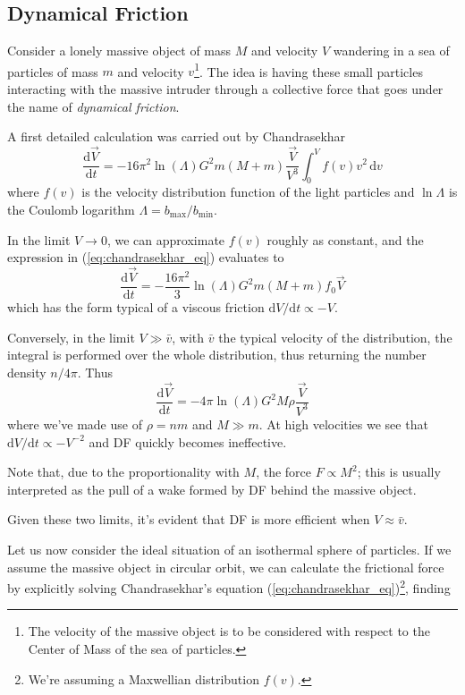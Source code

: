 \subsection{Dynamical Friction}
Consider a lonely massive object of mass $M$ and velocity $V$ wandering in a sea of particles of mass $m$ and velocity $v$\footnote{The velocity of the massive object is to be considered with respect to the Center of Mass of the sea of particles.}. The idea is having these small particles interacting with the massive intruder through a collective force that goes under the name of \emph{dynamical friction}.
\par A first detailed calculation was carried out by Chandrasekhar
\begin{equation}
    \frac{\text{d}\vec{V}}{\text{d}t} = -16\pi^{2}\ln(\Lambda)G^{2}m(M+m)\frac{\vec{V}}{V^{3}}\int_{0}^{V}f(v)v^{2}\,\text{d}v
    \label{eq:chandrasekhar_eq}
\end{equation}
where $f(v)$ is the velocity distribution function of the light particles and $\ln\Lambda$ is the Coulomb logarithm $\Lambda = b_{\text{max}}/b_{\text{min}}$.
\par In the limit $V \to 0$, we can approximate $f(v)$ roughly as constant, and the expression in (\ref{eq:chandrasekhar_eq}) evaluates to
\begin{equation*}
     \frac{\text{d}\vec{V}}{\text{d}t} = -\frac{16\pi^{2}}{3}\ln(\Lambda)G^{2}m(M+m)f_{0}\vec{V}
\end{equation*}
which has the form typical of a viscous friction $\text{d}V/\text{d}t \propto -V$.
\par Conversely, in the limit $V \gg \bar{v}$, with $\bar{v}$ the typical velocity of the distribution, the integral is performed over the whole distribution, thus returning the number density $n/4\pi$. Thus
\begin{equation*}
    \frac{\text{d}\vec{V}}{\text{d}t} = -4\pi\ln(\Lambda)G^{2}M\rho\frac{\vec{V}}{V^{3}}
\end{equation*}
where we've made use of $\rho = nm$ and $M \gg m$. At high velocities we see that $\text{d}V/\text{d}t \propto -V^{-2}$ and DF quickly becomes ineffective.
\par Note that, due to the proportionality with $M$, the force $F \propto M^{2}$; this is usually interpreted as the pull of a wake formed by DF behind the massive object.
\par Given these two limits, it's evident that DF is more efficient when $V \approx \bar{v}$.
\par Let us now consider the ideal situation of an isothermal sphere of particles. If we assume the massive object in circular orbit, we can calculate the frictional force by explicitly solving Chandrasekhar's equation (\ref{eq:chandrasekhar_eq})\footnote{We're assuming a Maxwellian distribution $f(v)$.}, finding
